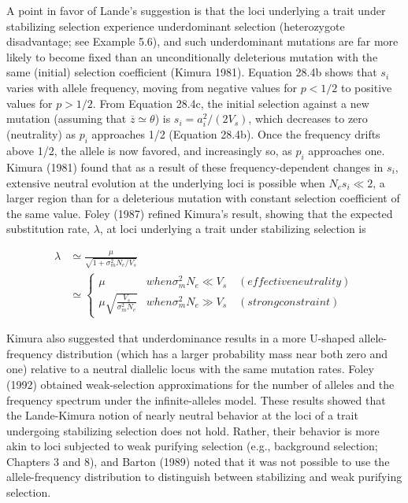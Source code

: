 \documentclass{article}
\begin{document}
A point in favor of Lande's suggestion is that the loci underlying a trait under stabilizing selection experience underdominant selection (heterozygote disadvantage; see Example 5.6), and such underdominant mutations are far more likely to become fixed than an unconditionally deleterious mutation with the same (initial) selection coefficient (Kimura 1981). Equation 28.4b shows that  $ s_i $ varies with allele frequency, moving from negative values for  $ p < 1/2 $ to positive values for  $ p > 1/2 $. From Equation 28.4c, the initial selection against a new mutation (assuming that  $ \overline{z} \simeq \theta $) is  $ s_i = a_i^2 / (2V_s) $, which decreases to zero (neutrality) as  $ p_i $ approaches 1/2 (Equation 28.4b). Once the frequency drifts above 1/2, the allele is now favored, and increasingly so, as  $ p_i $ approaches one. Kimura (1981) found that as a result of these frequency-dependent changes in  $ s_i $, extensive neutral evolution at the underlying loci is possible when  $ N_c s_i \ll 2 $, a larger region than for a deleterious mutation with constant selection coefficient of the same value. Foley (1987) refined Kimura's result, showing that the expected substitution rate,  $ \lambda $, at loci underlying a trait under stabilizing selection is

\begin{equation}
\begin{aligned}\lambda&\simeq\frac{\mu}{\sqrt{1+\sigma_{m}^{2}N_{e}/V_{s}}}\\&\simeq\begin{cases}\mu&when\sigma_{m}^{2}N_{e}\ll V_{s}\quad(effective neutrality)\\\mu\sqrt{\frac{V_{s}}{\sigma_{m}^{2}N_{e}}}&when\sigma_{m}^{2}N_{e}\gg V_{s}\quad(strong constraint)\end{cases}\end{aligned}
\tag{28.34b}
\label{eq:28_34b}
\end{equation}

Kimura also suggested that underdominance results in a more U-shaped allele-frequency distribution (which has a larger probability mass near both zero and one) relative to a neutral diallelic locus with the same mutation rates. Foley (1992) obtained weak-selection approximations for the number of alleles and the frequency spectrum under the infinite-alleles model. These results showed that the Lande-Kimura notion of nearly neutral behavior at the loci of a trait undergoing stabilizing selection does not hold. Rather, their behavior is more akin to loci subjected to weak purifying selection (e.g., background selection; Chapters 3 and 8), and Barton (1989) noted that it was not possible to use the allele-frequency distribution to distinguish between stabilizing and weak purifying selection.
\end{document}

